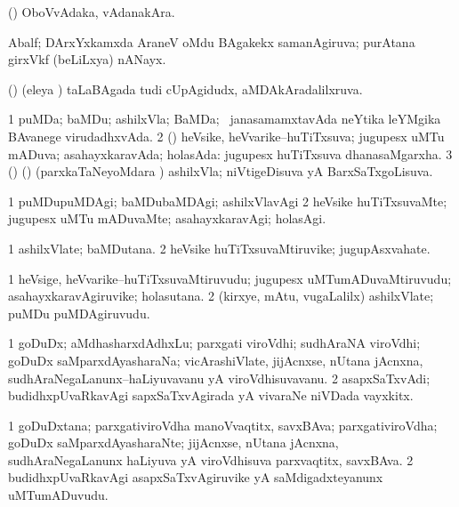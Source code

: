 \bentry
{}
\gl{\nA}
\bmng
(\saM) OboVvAdaka, vAdanakAra. 
\emng
\eentry

\bentry
{}
\gl{\nA}
\bmng
Abalf; DArxYxkamxda AraneV oMdu BAgakekx samanAgiruva; purAtana girxVkf (beLiLxya) nANayx. 
\emng
\eentry

\bentry
{}
\gl{\gu}
\bmng
(\jiVvi) (eleya \vi) taLaBAgada tudi cUpAgidudx, aMDAkAradalilxruva. 
\emng
\eentry

\bentry
{}
\gl{\gu}
\bmng
\bnum
\num{1} puMDa; baMDu; ashilxVla; BaMDa; \kanmu\ janasamamxtavAda neYtika leYMgika BAvanege virudadhxvAda. 
\num{2} (\AmA) heVsike, heVvarike--huTiTxsuva; jugupesx uMTu mADuva; asahayxkaravAda; holasAda:  jugupesx huTiTxsuva dhanasaMgarxha. 
\num{3} (\birx) (\nAyxshA) (parxkaTaNeyoMdara \vi) ashilxVla; niVtigeDisuva yA BarxSaTxgoLisuva. 
\enum
\emng
\eentry

\bentry
{}
\gl{\kirxvi}
\bmng
% 
\bnum
\num{1} puMDupuMDAgi; baMDubaMDAgi; ashilxVlavAgi 
\num{2} heVsike huTiTxsuvaMte; jugupesx uMTu mADuvaMte; asahayxkaravAgi; holasAgi. 
\enum
\emng
\eentry

\bentry
{}
\gl{\nA}
\bmng
% 
\bnum
\num{1} ashilxVlate; baMDutana. 
\num{2} heVsike huTiTxsuvaMtiruvike; jugupAsxvahate. 
\enum
\emng
\eentry

\bentry
{}
\gl{\nA}
\bmng
% 
\bnum
\num{1} heVsige, heVvarike--huTiTxsuvaMtiruvudu; jugupesx uMTumADuvaMtiruvudu; asahayxkaravAgiruvike; holasutana. 
\num{2} (kirxye, mAtu, \mo vugaLalilx) ashilxVlate; puMDu puMDAgiruvudu. 
\enum
\emng
\eentry

\bentry
{}
\gl{\nA}
\bmng
% 
\bnum
\num{1} goDuDx; aMdhasharxdAdhxLu; parxgati viroVdhi; sudhAraNA viroVdhi; goDuDx saMparxdAyasharaNa; vicArashiVlate, jijAcnxse, nUtana jAcnxna, sudhAraNegaLanunx--haLiyuvavanu yA viroVdhisuvavanu. 
\num{2} asapxSaTxvAdi; budidhxpUvaRkavAgi sapxSaTxvAgirada yA vivaraNe niVDada vayxkitx. 
\enum
\emng
\eentry

\bentry
{}
\gl{\nA}
\bmng
% 
\bnum
\num{1} goDuDxtana; parxgativiroVdha manoVvaqtitx, savxBAva; parxgativiroVdha; goDuDx saMparxdAyasharaNte; jijAcnxse, nUtana jAcnxna, sudhAraNegaLanunx haLiyuva yA viroVdhisuva parxvaqtitx, savxBAva. 
\num{2} budidhxpUvaRkavAgi asapxSaTxvAgiruvike yA saMdigadxteyanunx uMTumADuvudu. 
\enum
\emng
\eentry

